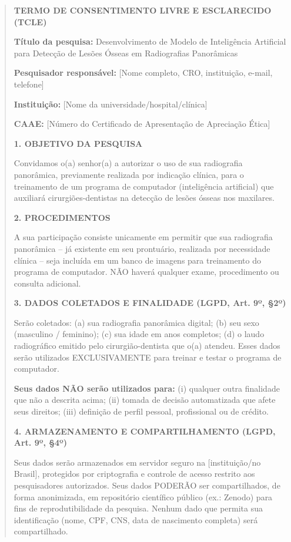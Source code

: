 \begin{quote}
\textbf{TERMO DE CONSENTIMENTO LIVRE E ESCLARECIDO (TCLE)}

\textbf{Título da pesquisa:} Desenvolvimento de Modelo de Inteligência Artificial
para Detecção de Lesões Ósseas em Radiografias Panorâmicas

\textbf{Pesquisador responsável:} [Nome completo, CRO, instituição, e-mail,
telefone]

\textbf{Instituição:} [Nome da universidade/hospital/clínica]

\textbf{CAAE:} [Número do Certificado de Apresentação de Apreciação Ética]

\bigskip

\textbf{1. OBJETIVO DA PESQUISA}

Convidamos o(a) senhor(a) a autorizar o uso de sua radiografia panorâmica,
previamente realizada por indicação clínica, para o treinamento de um programa
de computador (inteligência artificial) que auxiliará cirurgiões-dentistas na
detecção de lesões ósseas nos maxilares.

\textbf{2. PROCEDIMENTOS}

A sua participação consiste unicamente em permitir que sua radiografia
panorâmica -- já existente em seu prontuário, realizada por necessidade clínica
-- seja incluída em um banco de imagens para treinamento do programa de
computador. NÃO haverá qualquer exame, procedimento ou consulta adicional.

\textbf{3. DADOS COLETADOS E FINALIDADE (LGPD, Art. 9º, §2º)}

Serão coletados: (a) sua radiografia panorâmica digital; (b) seu sexo (masculino
/ feminino); (c) sua idade em anos completos; (d) o laudo radiográfico emitido
pelo cirurgião-dentista que o(a) atendeu. Esses dados serão utilizados
EXCLUSIVAMENTE para treinar e testar o programa de computador.

\textbf{Seus dados NÃO serão utilizados para:} (i) qualquer outra finalidade que
não a descrita acima; (ii) tomada de decisão automatizada que afete seus
direitos; (iii) definição de perfil pessoal, profissional ou de crédito.

\textbf{4. ARMAZENAMENTO E COMPARTILHAMENTO (LGPD, Art. 9º, §4º)}

Seus dados serão armazenados em servidor seguro na [instituição/no Brasil],
protegidos por criptografia e controle de acesso restrito aos pesquisadores
autorizados. Seus dados PODERÃO ser compartilhados, de forma anonimizada, em
repositório científico público (ex.: Zenodo) para fins de reprodutibilidade da
pesquisa. Nenhum dado que permita sua identificação (nome, CPF, CNS, data de
nascimento completa) será compartilhado.


\end{quote}
